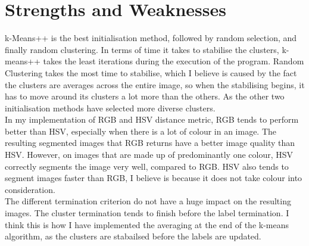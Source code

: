 \documentclass{article}
\begin{document}
\section{Strengths and Weaknesses}

k-Means++ is the best initialisation method, followed by random selection, and
finally random clustering. In terms of time it takes to stabilise the clusters,
k-means++ takes the least iterations during the execution of the program. Random
Clustering takes the most time to stabilise, which I believe is caused by the
fact the clusters are averages across the entire image, so when the stabilising
begins, it has to move around its clusters a lot more than the others. As the
other two initialisation methods have selected more diverse clusters.\\

In my implementation of RGB and HSV distance metric, RGB tends to perform better
than HSV, especially when there is a lot of colour in an image. The resulting
segmented images that RGB returns have a better image quality than HSV. However,
on images that are made up of predominantly one colour, HSV correctly segments
the image very well, compared to RGB. HSV also tends to segment images faster
than RGB, I believe is because it does not take colour into consideration.\\

The different termination criterion do not have a huge impact on the resulting
images. The cluster termination tends to finish before the label termination. I
think this is how I have implemented the averaging at the end of the k-means
algorithm, as the clusters are stabailsed before the labels are updated.

\end{document}

